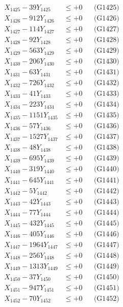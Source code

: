 \documentclass[a4paper,10pt]{article}
\begin{document}
{\begin{align}
X_{1425} - 39Y_{1425} &\leq +0 && \text{(G1425)} \\
X_{1426} - 912Y_{1426} &\leq +0 && \text{(G1426)} \\
X_{1427} - 114Y_{1427} &\leq +0 && \text{(G1427)} \\
X_{1428} - 92Y_{1428} &\leq +0 && \text{(G1428)} \\
X_{1429} - 563Y_{1429} &\leq +0 && \text{(G1429)} \\
X_{1430} - 206Y_{1430} &\leq +0 && \text{(G1430)} \\
\allowbreak
X_{1431} - 63Y_{1431} &\leq +0 && \text{(G1431)} \\
X_{1432} - 726Y_{1432} &\leq +0 && \text{(G1432)} \\
X_{1433} - 41Y_{1433} &\leq +0 && \text{(G1433)} \\
X_{1434} - 223Y_{1434} &\leq +0 && \text{(G1434)} \\
X_{1435} - 1151Y_{1435} &\leq +0 && \text{(G1435)} \\
X_{1436} - 57Y_{1436} &\leq +0 && \text{(G1436)} \\
X_{1437} - 1527Y_{1437} &\leq +0 && \text{(G1437)} \\
X_{1438} - 48Y_{1438} &\leq +0 && \text{(G1438)} \\
X_{1439} - 695Y_{1439} &\leq +0 && \text{(G1439)} \\
X_{1440} - 319Y_{1440} &\leq +0 && \text{(G1440)} \\
\allowbreak
X_{1441} - 645Y_{1441} &\leq +0 && \text{(G1441)} \\
X_{1442} - 5Y_{1442} &\leq +0 && \text{(G1442)} \\
X_{1443} - 42Y_{1443} &\leq +0 && \text{(G1443)} \\
X_{1444} - 77Y_{1444} &\leq +0 && \text{(G1444)} \\
X_{1445} - 432Y_{1445} &\leq +0 && \text{(G1445)} \\
X_{1446} - 405Y_{1446} &\leq +0 && \text{(G1446)} \\
X_{1447} - 1964Y_{1447} &\leq +0 && \text{(G1447)} \\
X_{1448} - 256Y_{1448} &\leq +0 && \text{(G1448)} \\
X_{1449} - 1313Y_{1449} &\leq +0 && \text{(G1449)} \\
X_{1450} - 37Y_{1450} &\leq +0 && \text{(G1450)} \\
\allowbreak
X_{1451} - 947Y_{1451} &\leq +0 && \text{(G1451)} \\
X_{1452} - 70Y_{1452} &\leq +0 && \text{(G1452)} \\

\end{align}}
\end{document}
